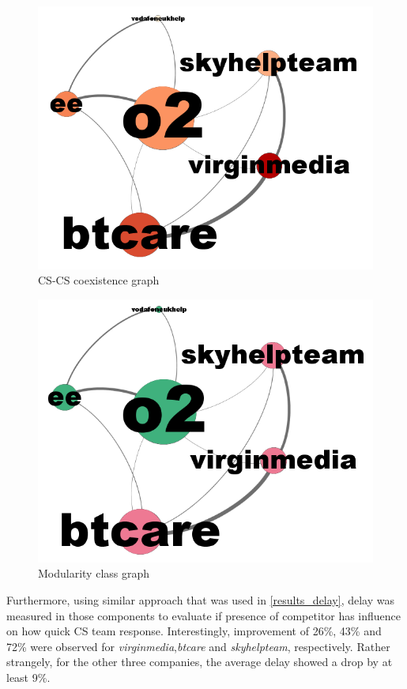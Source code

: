 \documentclass[sigconf]{acmart}
\begin{document}
\begin{figure}[htb]
\centering
\includegraphics[width=\columnwidth]{images/coexistencegraph.png}
\caption{CS-CS coexistence graph}
\label{fig:coexistencegraph}
\end{figure}

\begin{figure}[htb]
\centering
\includegraphics[width=\columnwidth]{images/modularityclassgraph.png}
\caption{Modularity class graph}
\label{fig:modularityclassgraph}
\end{figure}

Furthermore, using similar approach that was used in \ref{results_delay}, 
delay was measured in those components to evaluate if presence of competitor 
has influence on how quick CS team response. Interestingly, improvement of
26\%, 43\% and 72\% were observed for {\emph{virginmedia}},{\emph{btcare}}
and {\emph{skyhelpteam}}, respectively. Rather strangely, for the other 
three companies, the average delay showed a drop by at least 9\%.
\end{document}
